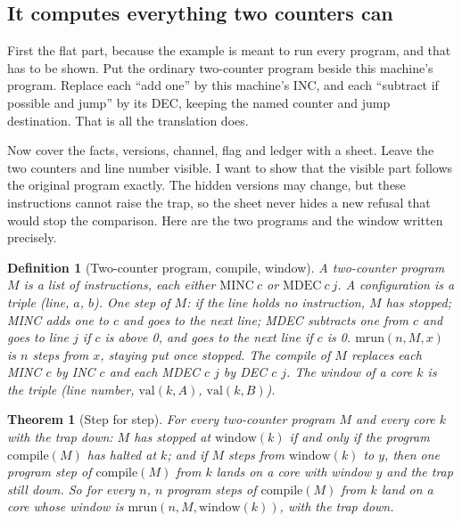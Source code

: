 \documentclass[11pt,twoside]{article}
\theoremstyle{thielethm}
\newtheorem{theorem}{Theorem}[section]
\theoremstyle{thieledef}
\newtheorem{definition}{Definition}[section]
\theoremstyle{thieledef}
\theoremstyle{thieledef}
\theoremstyle{thielethm}
\theoremstyle{thieleobs}
\theoremstyle{thielethm}
\begin{document}
\subsection{It computes everything two counters can}

First the flat part, because the example is meant to run every program, and that has to be shown.
Put the ordinary two-counter program beside this machine's program. Replace
each ``add one'' by this machine's INC, and each ``subtract if possible and
jump'' by its DEC, keeping the named counter and jump destination. That is
all the translation does.

Now cover the facts, versions, channel, flag and ledger with a sheet. Leave
the two counters and line number visible. I want to show that the visible
part follows the original program exactly. The hidden versions may change,
but these instructions cannot raise the trap, so the sheet never hides a
new refusal that would stop the comparison. Here are the two programs and
the window written precisely.

\begin{definition}[Two-counter program, compile, window]\label{def:u34-minsky}
A \emph{two-counter program} $M$ is a list of instructions, each either $\mathrm{MINC}\ c$ or
$\mathrm{MDEC}\ c\ j$. A configuration is a triple (line, $a$, $b$). One step of $M$: if
the line holds no instruction, $M$ has \emph{stopped}; MINC adds one to $c$ and goes to the next
line; MDEC subtracts one from $c$ and goes to line $j$ if $c$ is above 0, and goes to the
next line if $c$ is 0. $\mathrm{mrun}(n, M, x)$ is $n$ steps from $x$, staying put once
stopped. The \emph{compile} of $M$ replaces each MINC $c$ by INC $c$ and each MDEC $c$ $j$ by DEC
$c$ $j$. The \emph{window} of a core $k$ is the triple (line number, $\mathrm{val}(k, A)$,
$\mathrm{val}(k, B)$).
\end{definition}

\begin{theorem}[Step for step]\label{thm:u34-simulation}
For every two-counter program $M$ and every core $k$ with the trap down: $M$ has stopped at
$\mathrm{window}(k)$ if and only if the program $\mathrm{compile}(M)$ has halted at $k$;
and if $M$ steps from $\mathrm{window}(k)$ to $y$, then one program step of
$\mathrm{compile}(M)$ from $k$ lands on a core with window $y$ and the trap still down. So
for every $n$, $n$ program steps of $\mathrm{compile}(M)$ from $k$ land on a core whose
window is $\mathrm{mrun}(n, M, \mathrm{window}(k))$, with the trap down.
\end{theorem}
\end{document}
